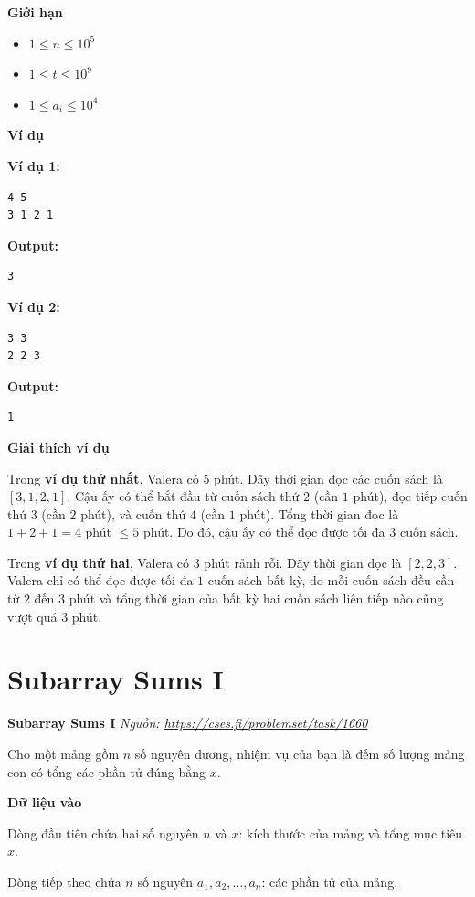 \documentclass[12pt,a4paper]{article}
\newcommand{\problem}[2]{%
  \begin{mdframed}[
    linecolor=framecolor,
    linewidth=1.5pt,
    backgroundcolor=white,
    topline=true, bottomline=true,
    leftline=true, rightline=true,
    innerleftmargin=10pt, innerrightmargin=10pt,
    innertopmargin=6pt, innerbottommargin=6pt,
  ]
  \textbf{\large #1} \hfill \textit{Nguồn: #2}
  \end{mdframed}
  \vspace{4pt}%
}
\newcommand{\inputformat}{%
  \vspace{6pt}\textbf{\textcolor{sectioncolor}{Dữ liệu vào}}\par\vspace{2pt}%
}
\newcommand{\constraints}{%
  \vspace{6pt}\textbf{\textcolor{sectioncolor}{Giới hạn}}\par\vspace{2pt}%
}
\newcommand{\example}{%
  \vspace{6pt}\textbf{\textcolor{sectioncolor}{Ví dụ}}\par\vspace{2pt}%
}
\newcommand{\explanation}{%
  \vspace{6pt}\textbf{\textcolor{sectioncolor}{Giải thích ví dụ}}\par\vspace{2pt}%
}
\begin{document}
\constraints
\begin{constraintbox}
\begin{itemize}[leftmargin=*,noitemsep]
    \item $1 \le n \le 10^5$
    \item $1 \le t \le 10^9$
    \item $1 \le a_i \le 10^4$
\end{itemize}
\end{constraintbox}

\example

\textbf{Ví dụ 1:}
\begin{lstlisting}
4 5
3 1 2 1
\end{lstlisting}
\textbf{Output:}
\begin{lstlisting}
3
\end{lstlisting}

\textbf{Ví dụ 2:}
\begin{lstlisting}
3 3
2 2 3
\end{lstlisting}
\textbf{Output:}
\begin{lstlisting}
1
\end{lstlisting}

\explanation
Trong \textbf{ví dụ thứ nhất}, Valera có $5$ phút. Dãy thời gian đọc các cuốn sách là $[3, 1, 2, 1]$. Cậu ấy có thể bắt đầu từ cuốn sách thứ $2$ (cần $1$ phút), đọc tiếp cuốn thứ $3$ (cần $2$ phút), và cuốn thứ $4$ (cần $1$ phút). Tổng thời gian đọc là $1 + 2 + 1 = 4$ phút $\le 5$ phút. Do đó, cậu ấy có thể đọc được tối đa $3$ cuốn sách.

Trong \textbf{ví dụ thứ hai}, Valera có $3$ phút rảnh rỗi. Dãy thời gian đọc là $[2, 2, 3]$. Valera chỉ có thể đọc được tối đa $1$ cuốn sách bất kỳ, do mỗi cuốn sách đều cần từ $2$ đến $3$ phút và tổng thời gian của bất kỳ hai cuốn sách liên tiếp nào cũng vượt quá $3$ phút.


\section{Subarray Sums I}
\problem{Subarray Sums I}{\url{https://cses.fi/problemset/task/1660}}

Cho một mảng gồm $n$ số nguyên dương, nhiệm vụ của bạn là đếm số lượng mảng con có tổng các phần tử đúng bằng $x$.

\inputformat
\begin{inputbox}
Dòng đầu tiên chứa hai số nguyên $n$ và $x$: kích thước của mảng và tổng mục tiêu $x$.

Dòng tiếp theo chứa $n$ số nguyên $a_1, a_2, \dots, a_n$: các phần tử của mảng.
\end{inputbox}
\end{document}
